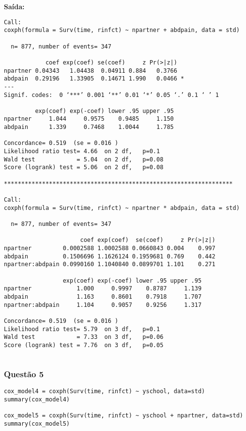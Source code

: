 \documentclass[a4paper,12pt]{article}
\begin{document}
\textbf{Saída:}
\begin{verbatim}
Call:
coxph(formula = Surv(time, rinfct) ~ npartner + abdpain, data = std)

  n= 877, number of events= 347 

            coef exp(coef) se(coef)     z Pr(>|z|)  
npartner 0.04343   1.04438  0.04911 0.884   0.3766  
abdpain  0.29196   1.33905  0.14671 1.990   0.0466 *
---
Signif. codes:  0 ‘***’ 0.001 ‘**’ 0.01 ‘*’ 0.05 ‘.’ 0.1 ‘ ’ 1

         exp(coef) exp(-coef) lower .95 upper .95
npartner     1.044     0.9575    0.9485     1.150
abdpain      1.339     0.7468    1.0044     1.785

Concordance= 0.519  (se = 0.016 )
Likelihood ratio test= 4.66  on 2 df,   p=0.1
Wald test            = 5.04  on 2 df,   p=0.08
Score (logrank) test = 5.06  on 2 df,   p=0.08

******************************************************************

Call:
coxph(formula = Surv(time, rinfct) ~ npartner * abdpain, data = std)

  n= 877, number of events= 347 

                      coef exp(coef)  se(coef)     z Pr(>|z|)
npartner         0.0002588 1.0002588 0.0660843 0.004    0.997
abdpain          0.1506696 1.1626124 0.1959681 0.769    0.442
npartner:abdpain 0.0990160 1.1040840 0.0899701 1.101    0.271

                 exp(coef) exp(-coef) lower .95 upper .95
npartner             1.000     0.9997    0.8787     1.139
abdpain              1.163     0.8601    0.7918     1.707
npartner:abdpain     1.104     0.9057    0.9256     1.317

Concordance= 0.519  (se = 0.016 )
Likelihood ratio test= 5.79  on 3 df,   p=0.1
Wald test            = 7.33  on 3 df,   p=0.06
Score (logrank) test = 7.76  on 3 df,   p=0.05


\end{verbatim}

\subsubsection{Questão 5}

\begin{lstlisting}
cox_model4 = coxph(Surv(time, rinfct) ~ yschool, data=std)
summary(cox_model4)

cox_model5 = coxph(Surv(time, rinfct) ~ yschool + npartner, data=std)
summary(cox_model5)
\end{lstlisting}
\end{document}
